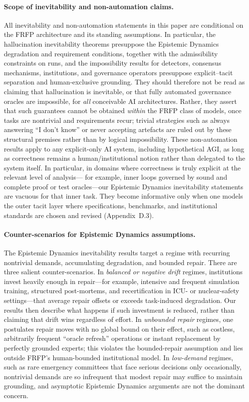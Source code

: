 \paragraph{Scope of inevitability and non-automation claims.}
All inevitability and non-automation statements in this paper are conditional on the FRFP
architecture and its standing assumptions. In particular, the hallucination inevitability theorems
presuppose the Epistemic Dynamics degradation and requirement conditions, together with the admissibility
constraints on runs, and the impossibility results for detectors, consensus mechanisms, institutions,
and governance operators presuppose explicit--tacit separation and human-exclusive grounding.
They should therefore not be read as claiming that hallucination is inevitable, or that fully automated
governance oracles are impossible, for \emph{all} conceivable AI architectures. Rather, they assert
that such guarantees cannot be obtained \emph{within} the FRFP class of models, once tasks are
nontrivial and requirements recur; trivial strategies such as always answering ``I don't know'' or
never accepting artefacts are ruled out by these structural premises rather than by logical impossibility.
These non-automation results apply to any explicit-only AI system, including hypothetical AGI, as long as correctness remains a human/institutional notion rather than delegated to the system itself.
In particular, in domains where correctness is truly explicit at the relevant level of analysis—
for example, inner loops governed by sound and complete proof or test oracles—our Epistemic Dynamics
inevitability statements are vacuous for that inner task.
They become informative only when one models the outer tacit layer where specifications, benchmarks,
and institutional standards are chosen and revised (Appendix~D.3).

\paragraph{Counter-scenarios for Epistemic Dynamics assumptions.}
The Epistemic Dynamics inevitability results target a regime with recurring nontrivial demands, accumulating
degradation, and bounded repair. There are three salient counter-scenarios. In \emph{balanced or
negative drift} regimes, institutions invest heavily enough in repair---for example, intensive and
frequent simulation training, structured post-mortems, and recertification in ICU- or nuclear-safety
settings---that average repair offsets or exceeds task-induced degradation. Our results then describe
what happens if such investment is reduced, rather than claiming that drift wins regardless of effort.
In \emph{unbounded repair} regimes, one postulates repair moves with no global bound on their
effect, such as costless, arbitrarily frequent ``oracle refresh'' operations or instant replacement by
perfectly grounded experts; this violates the bounded-repair assumption and lies outside FRFP's
human-bounded institutional model. In \emph{low-demand} regimes, such as rare emergency
committees that face serious decisions only occasionally, nontrivial demands are so infrequent that
modest repair may suffice to maintain grounding, and asymptotic Epistemic Dynamics arguments are not the
dominant concern.

